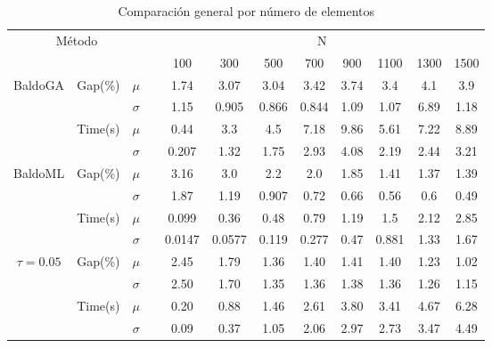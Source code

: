 \documentclass[spanish, a4paper, 12pt, openany,final]{book}
\begin{document}
\begin{table}[H]
	\caption{Comparación general por número de elementos}
	\label{tab:general_comparison}
	\begin{adjustbox}{width=\columnwidth,center}
		\begin{tabular}{cccccccccccc}
			\multicolumn{3}{c}{Método}&  &\multicolumn{8}{c}{N}\\
			\cline{1-3} \cline{5-12}
			\multicolumn{3}{c}{} &  & 100  & 300  & 500  & 700  & 900  & 1100 & 1300 & 1500\\
			\hline
			\multirow{4}{*}{BaldoGA} & \multirow{2}{*}{Gap(\%)} & $\mu$ && 1.74 & 3.07 & 3.04 & 3.42 & 3.74 & 3.4 & 4.1 & 3.9 \\
			&                          & $\sigma$ & & 1.15 & 0.905 & 0.866 & 0.844 & 1.09 & 1.07 & 6.89 & 1.18 \\
			\cline{2-3}
			& \multirow{2}{*}{Time(s)} & $\mu$ && 0.44 & 3.3 & 4.5 & 7.18 & 9.86 & 5.61 & 7.22 & 8.89 \\
			&                          & $\sigma$ & & 0.207 & 1.32 & 1.75 & 2.93 & 4.08 & 2.19 & 2.44 & 3.21 \\
			\hline		 	 
			\multirow{4}{*}{BaldoML} & \multirow{2}{*}{Gap(\%)} & $\mu$ && 3.16 & 3.0 & 2.2 & 2.0 & 1.85 & 1.41 & 1.37 & 1.39 \\
			&                          & $\sigma$ & & 1.87 & 1.19 & 0.907 & 0.72 & 0.66 & 0.56 & 0.6 & 0.49 \\
			\cline{2-3}
			& \multirow{2}{*}{Time(s)} & $\mu$    && 0.099 & 0.36 & 0.48 & 0.79 & 1.19 & 1.5 & 2.12 & 2.85 \\
			&                          & $\sigma$ && 0.0147 & 0.0577 & 0.119 & 0.277 & 0.47 & 0.881 & 1.33 & 1.67 \\
			\hline		 						 
			
			\multirow{4}{*}{$\tau=0.05$} & \multirow{2}{*}{Gap(\%)} & $\mu$ && 2.45 & 1.79 & 1.36 & 1.40 & 1.41 & 1.40 & 1.23 & 1.02 \\
			&                          & $\sigma$ & & 2.50 & 1.70 & 1.35 & 1.36 & 1.38 & 1.36 & 1.26 & 1.15 \\
			\cline{2-3}
			& \multirow{2}{*}{Time(s)} & $\mu$ && 0.20 & 0.88 & 1.46 & 2.61 & 3.80 & 3.41 & 4.67 & 6.28 \\
			&                          & $\sigma$ & & 0.09 & 0.37 & 1.05 & 2.06 & 2.97 & 2.73 & 3.47 & 4.49 \\
			\hline		 						        
			
		\end{tabular}
	\end{adjustbox}
\end{table}
\end{document}
